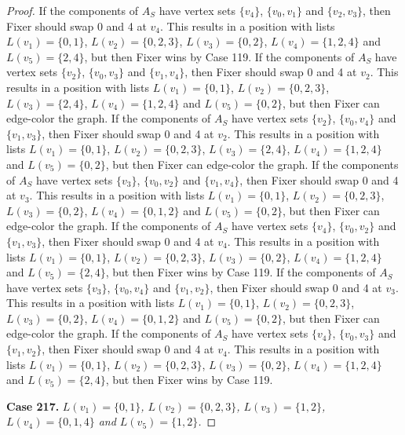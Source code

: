\documentclass[12pt]{amsart}
\theoremstyle{plain}
\theoremstyle{definition}
\theoremstyle{remark}
\begin{document}
\begin{proof}
If the components of $A_S$ have vertex sets $\{v_4\}$, $\{v_0, v_1\}$ and $\{v_2, v_3\}$, then Fixer should swap 0 and 4 at $v_4$. This results in a position with lists $L(v_1) = \{0, 1\}$, $L(v_2) = \{0, 2, 3\}$, $L(v_3) = \{0, 2\}$, $L(v_4) = \{1, 2, 4\}$ and $L(v_5) = \{2, 4\}$, but then Fixer wins by Case 119.
If the components of $A_S$ have vertex sets $\{v_2\}$, $\{v_0, v_3\}$ and $\{v_1, v_4\}$, then Fixer should swap 0 and 4 at $v_2$. This results in a position with lists $L(v_1) = \{0, 1\}$, $L(v_2) = \{0, 2, 3\}$, $L(v_3) = \{2, 4\}$, $L(v_4) = \{1, 2, 4\}$ and $L(v_5) = \{0, 2\}$, but then Fixer can edge-color the graph.
If the components of $A_S$ have vertex sets $\{v_2\}$, $\{v_0, v_4\}$ and $\{v_1, v_3\}$, then Fixer should swap 0 and 4 at $v_2$. This results in a position with lists $L(v_1) = \{0, 1\}$, $L(v_2) = \{0, 2, 3\}$, $L(v_3) = \{2, 4\}$, $L(v_4) = \{1, 2, 4\}$ and $L(v_5) = \{0, 2\}$, but then Fixer can edge-color the graph.
If the components of $A_S$ have vertex sets $\{v_3\}$, $\{v_0, v_2\}$ and $\{v_1, v_4\}$, then Fixer should swap 0 and 4 at $v_3$. This results in a position with lists $L(v_1) = \{0, 1\}$, $L(v_2) = \{0, 2, 3\}$, $L(v_3) = \{0, 2\}$, $L(v_4) = \{0, 1, 2\}$ and $L(v_5) = \{0, 2\}$, but then Fixer can edge-color the graph.
If the components of $A_S$ have vertex sets $\{v_4\}$, $\{v_0, v_2\}$ and $\{v_1, v_3\}$, then Fixer should swap 0 and 4 at $v_4$. This results in a position with lists $L(v_1) = \{0, 1\}$, $L(v_2) = \{0, 2, 3\}$, $L(v_3) = \{0, 2\}$, $L(v_4) = \{1, 2, 4\}$ and $L(v_5) = \{2, 4\}$, but then Fixer wins by Case 119.
If the components of $A_S$ have vertex sets $\{v_3\}$, $\{v_0, v_4\}$ and $\{v_1, v_2\}$, then Fixer should swap 0 and 4 at $v_3$. This results in a position with lists $L(v_1) = \{0, 1\}$, $L(v_2) = \{0, 2, 3\}$, $L(v_3) = \{0, 2\}$, $L(v_4) = \{0, 1, 2\}$ and $L(v_5) = \{0, 2\}$, but then Fixer can edge-color the graph.
If the components of $A_S$ have vertex sets $\{v_4\}$, $\{v_0, v_3\}$ and $\{v_1, v_2\}$, then Fixer should swap 0 and 4 at $v_4$. This results in a position with lists $L(v_1) = \{0, 1\}$, $L(v_2) = \{0, 2, 3\}$, $L(v_3) = \{0, 2\}$, $L(v_4) = \{1, 2, 4\}$ and $L(v_5) = \{2, 4\}$, but then Fixer wins by Case 119.

\noindent\textbf{Case 217.  }\textit{$L(v_1) = \{0, 1\}$, $L(v_2) = \{0, 2, 3\}$, $L(v_3) = \{1, 2\}$, $L(v_4) = \{0, 1, 4\}$ and $L(v_5) = \{1, 2\}$.}


\end{proof}
\end{document}
